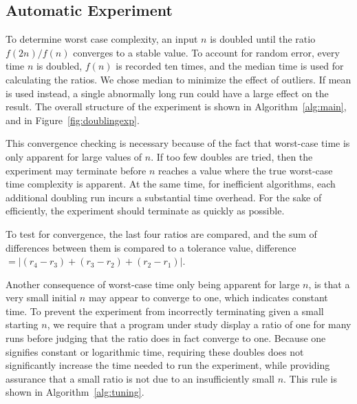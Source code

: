   \subsection{Automatic Experiment}
  \label{subsec:experiment}

  To determine worst case complexity, an input $n$ is doubled until the 
  ratio $f(2n) / f(n)$ converges to a stable value. To account for random
  error, every time $n$ is doubled, $f(n)$ is recorded ten times, and the
  median time is used for calculating the ratios.  We chose
  median to minimize the effect of outliers. If mean is used instead, a
  single abnormally long run could have a large effect on the result. The overall 
  structure of the experiment is shown in Algorithm~\ref{alg:main}, and in
  Figure~\ref{fig:doublingexp}.

  This convergence checking is necessary because of the fact that worst-case
  time is only apparent for large values of $n$. If too few doubles
  are tried, then the experiment may terminate before $n$ reaches a value
  where the true worst-case time complexity is apparent. At the same time,
  for inefficient  algorithms, each additional doubling run incurs a substantial
  time overhead. For the sake of efficiently, the experiment should
  terminate as quickly as possible.

  To test for convergence, the last four ratios are compared, and the
  sum of differences between them is compared to a tolerance value, 
  difference $= |(r_4 - r_3) + (r_3 -r_2) + (r_2 - r_1)|$.
 

  Another consequence of worst-case time only being apparent for large
  $n$, is that a very small initial $n$ may appear to converge to one,
  which indicates constant time. To prevent the
  experiment from incorrectly terminating given a small starting $n$, we
  require that a program under study display a ratio of one for many
  runs before judging that the ratio does in fact converge to one. Because 
  one signifies constant or logarithmic 
  time, requiring these doubles does not significantly increase the time needed
  to run the experiment, while providing assurance that a small ratio is not due
  to an insufficiently small $n$. This rule is shown in 
  Algorithm~\ref{alg:tuning}.
